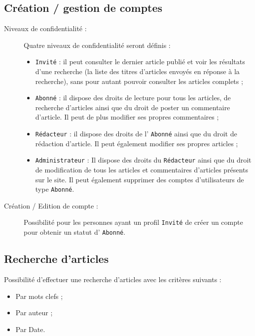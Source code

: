 \documentclass[a4paper,11pt]{article}
\begin{document}
\subsection{Création / gestion de comptes}
    \begin{description}
	\item[Niveaux de confidentialité :] Quatre niveaux de confidentialité seront définis :
	           \begin{itemize}
		    \item \texttt{Invité} : il peut consulter le dernier article publié et voir les résultats d'une recherche (la liste des titres d'articles envoyés en réponse à la recherche), sans pour autant pouvoir consulter les articles complets ;
		    \item \texttt{Abonné} : il dispose des droits de lecture pour tous les articles, de recherche d'articles ainsi que du droit de poster un commentaire d'article. Il peut de plus modifier ses propres commentaires ;
		    \item \texttt{Rédacteur} : il dispose des droits de l'              \texttt{Abonné} ainsi que du droit de rédaction d'article. Il peut également modifier ses propres articles ;
		    \item \texttt{Administrateur} : Il dispose des droits du 	             \texttt{Rédacteur} ainsi que du droit de modification de tous les articles et commentaires d'articles présents sur le site. Il peut également supprimer des comptes d'utilisateurs de type \texttt{Abonné}.
		    \end{itemize}

	\item[Création / Edition de compte :] Possibilité pour les personnes ayant un profil        \texttt{In\-vité} de créer un compte pour obtenir un statut d'        \texttt{Abonné}.
    \end{description}

\subsection{Recherche d'articles}
    Possibilité d'effectuer une recherche d'articles avec les critères suivants :
    \begin{itemize}
	\item Par mots clefs ;
	\item Par auteur ;
	\item Par Date.
    \end{itemize}
\end{document}

